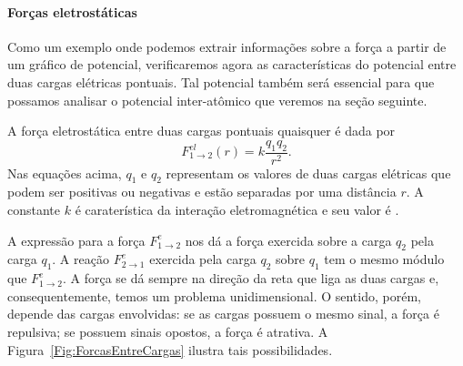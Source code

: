 \paragraph{Forças eletrostáticas}

Como um exemplo onde podemos extrair informações sobre a força a partir de um gráfico de potencial, verificaremos agora as características do potencial entre duas cargas elétricas pontuais. Tal potencial também será essencial para que possamos analisar o potencial inter-atômico que veremos na seção seguinte.

A força eletrostática entre duas cargas pontuais quaisquer é dada por
\begin{equation}
    F_{1\to 2}^{el}(r) = k \frac{q_1 q_2}{r^2}.
\end{equation}
%
Nas equações acima, $q_1$ e $q_2$ representam os valores de duas cargas elétricas que podem ser positivas ou negativas e estão separadas por uma distância $r$. A constante $k$ é caraterística da interação eletromagnética e seu valor é .

A expressão para a força $F_{1\to 2}^e$ nos dá a força exercida sobre a carga $q_2$ pela carga $q_1$. A reação $F_{2\to 1}^e$ exercida pela carga $q_2$ sobre $q_1$ tem o mesmo módulo que $F_{1\to 2}^e$. A força se dá sempre na direção da reta que liga as duas cargas e, consequentemente, temos um problema unidimensional. O sentido, porém, depende das cargas envolvidas: se as cargas possuem o mesmo sinal, a força é repulsiva; se possuem sinais opostos, a força é atrativa. A Figura~\ref{Fig:ForcasEntreCargas} ilustra tais possibilidades.

